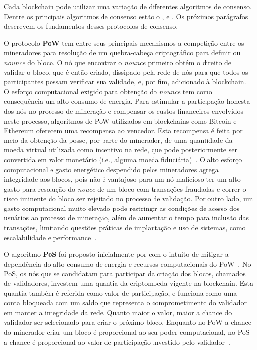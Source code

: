 Cada blockchain pode utilizar uma variação de diferentes algoritmos de consenso. Dentre os principais algoritmos de consenso estão o ,  e . Os próximos parágrafos descrevem os fundamentos desses protocolos de consenso.

O protocolo \textbf{PoW} tem entre seus principais mecanismos a competição entre os mineradores para resolução de um quebra-cabeça criptográfico para definir ou \textit{nounce} do bloco. O nó que encontrar o \textit{nounce} primeiro obtém o direito de validar o bloco, que é então criado, dissipado pela rede de nós para que todos os participantes possam verificar sua validade, e, por fim, adicionado à blockchain. O esforço computacional exigido para obtenção do \textit{nounce} tem como consequência um alto consumo de energia. Para estimular a participação honesta dos nós no processo de mineração e compensar os custos financeiros envolvidos neste processo, algoritmos de PoW utilizados em blockchains como Bitcoin e Ethereum oferecem uma recompensa ao vencedor. Esta recompensa é feita por meio da obtenção da posse, por parte do minerador, de uma quantidade da moeda virtual utilizada como incentivo na rede, que pode posteriormente ser convertida em valor monetário (i.e., alguma moeda fiduciária)~\cite{overview-bitcoin2008nakamoto, ethereum2014whitepaper, overview-blockchainbasic2018drescher}. O alto esforço computacional e gasto energético despendido pelos mineradores agrega integridade aos blocos, pois não é vantajoso para um nó malicioso ter um alto gasto para resolução do \textit{nouce} de um bloco com transações fraudadas e correr o risco iminente do bloco ser rejeitado no processo de validação. Por outro lado, um gasto computacional muito elevado pode restringir as condições de acesso dos usuários ao processo de mineração, além de aumentar o tempo para inclusão das transações, limitando questões práticas de implantação e uso de sistemas, como escalabilidade e performance~\cite{consenso-Bouraga2021}.

O algoritmo \textbf{PoS} foi proposto inicialmente por  com o intuito de mitigar a dependência do alto consumo de energia e recursos computacionais do PoW~\cite{overview-bitcoin-energy2014}. No PoS, os nós que se candidatam para participar da criação dos blocos, chamados de validadores, investem uma quantia da criptomoeda vigente na blockchain. Esta quantia também é referida como valor de participação, e funciona como uma conta bloqueada com um saldo que representa o comprometimento do validador em manter a integridade da rede. Quanto maior o valor, maior a chance do validador ser selecionado para criar o próximo bloco. Enquanto no PoW a chance do minerador criar um bloco é proporcional ao seu poder computacional, no PoS a chance é proporcional ao valor de participação investido pelo validador~\cite{consenso-xiao-2020, overview-dinh-2018}.

